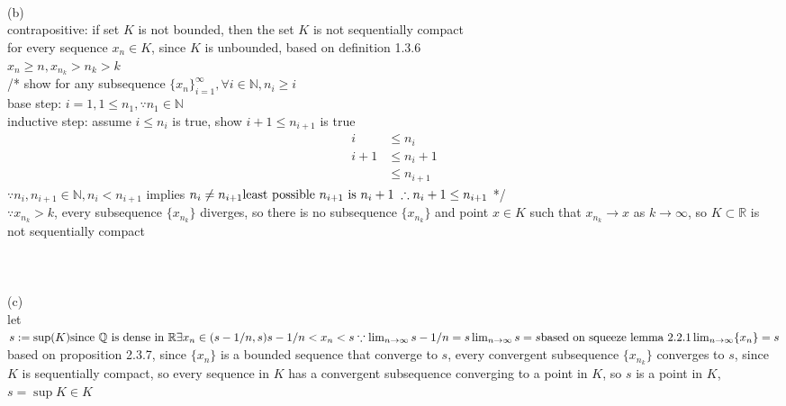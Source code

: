 \documentclass[12pt, border = 4pt, multi]{article} %
\begin{document}
\\
\\
\\
(b)\\
contrapositive: if set $K$ is not bounded, then the set $K$ is not sequentially compact\\
for every sequence $x_n \in K$, since $K$ is unbounded, based on definition 1.3.6\\
$x_n \geq n, x_{n_k} > n_k > k$\\
/* show for any subsequence $\{x_n\}_{i = 1} ^ {\infty}, \forall i \in \mathbb{N}, n_i \geq i$\\
base step: $i = 1, 1 \leq n_1, \because n_1 \in \mathbb{N}$\\
inductive step: assume $i \leq n_i$ is true, show $i + 1 \leq n_{i + 1}$ is true
\begin{align*}
i &\leq n_i\\
i + 1 &\leq n_i + 1\\
&\leq n_{i + 1}
\end{align*}
$\because n_i, n_{i + 1} \in \mathbb{N}, n_i < n_{i + 1}$ implies $n_i \not= n_{i + 1}\\
\text{least possible } n_{i + 1} \text{ is } n_i + 1\;\therefore n_i + 1 \leq n_{i + 1}$ */\\
$\because x_{n_k} > k$, every subsequence $\{x_{n_k}\}$ diverges, so there is no subsequence $\{x_{n_k}\}$ and point $x \in K$ such that $x_{n_k} \rightarrow x$ as $k \rightarrow \infty$, so $K \subset \mathbb{R}$ is not sequentially compact\\
\\
\\
\\
(c)\\
let $s := \sup(K)\\
\text{since } \mathbb{Q} \text{ is dense in } \mathbb{R}\\
\exists x_n \in (s - 1 / n, s)\\
s - 1 / n < x_n < s\\
\because \lim_{n \rightarrow \infty} s - 1 / n = s\\
\lim_{n \rightarrow \infty} s = s\\
\text{based on squeeze lemma 2.2.1}\\
\lim_{n \rightarrow \infty} \{x_n\} = s\\$
based on proposition 2.3.7, since $\{x_n\}$ is a bounded sequence that converge to $s$, every convergent subsequence $\{x_{n_k}\}$ converges to $s$, since $K$ is sequentially compact, so every sequence in $K$ has a convergent subsequence converging to a point in $K$, so $s$ is a point in $K$, $s = \sup K \in K$\\
\end{document}
